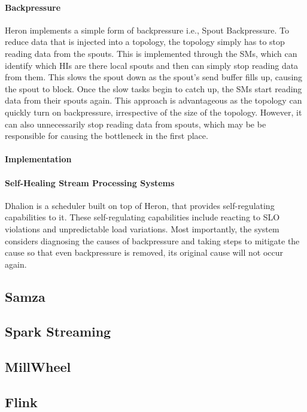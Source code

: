 \paragraph{Backpressure} Heron implements a simple form of backpressure i.e., Spout Backpressure. To reduce data that is injected into a topology, the topology simply has to stop reading data from the spouts. This is implemented through the SMs, which can identify which HIs are there local spouts and then can simply stop reading data from them. This slows the spout down as the spout's send buffer  fills up, causing the spout to block. Once the slow tasks begin to catch up, the SMs start reading data from their spouts again. This approach is advantageous as the topology can quickly turn on backpressure, irrespective of the size of the topology. However, it can also unnecessarily stop reading data from spouts, which may be be responsible for causing the bottleneck in the first place.

\paragraph{Implementation} 

\paragraph{Self-Healing Stream Processing Systems} Dhalion is a scheduler built on top of Heron, that provides self-regulating capabilities to it. These self-regulating capabilities include reacting to SLO violations and unpredictable load variations. Most importantly, the system considers diagnosing the causes of backpressure and taking steps to mitigate the cause so that even backpressure is removed, its original cause will not occur again. 


\subsection{Samza}
\subsection{Spark Streaming}
\subsection{MillWheel}
\subsection{Flink}
